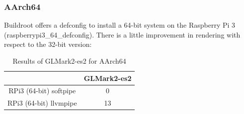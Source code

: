 \documentclass[12pt,a4paper,oneside]{article}
\begin{document}
\subsubsection*{AArch64}
Buildroot offers a defconfig to install a 64-bit system on the Raspberry Pi 3
(raspberrypi3\_64\_defconfig). There is a little improvement in rendering with
respect to the 32-bit version:
\begin{table}[h!]
  \begin{center}
    \caption{Results of GLMark2-es2 for AArch64}
    \label{tab:glmark2_AArch64}
    \begin{tabular}{c|c}
    & {GLMark2-es2} \\
    \hline
    RPi3 (64-bit) softpipe & 0\\
    RPi3 (64-bit) llvmpipe & 13\\
    \end{tabular}
  \end{center}
\end{table}
\end{document}

